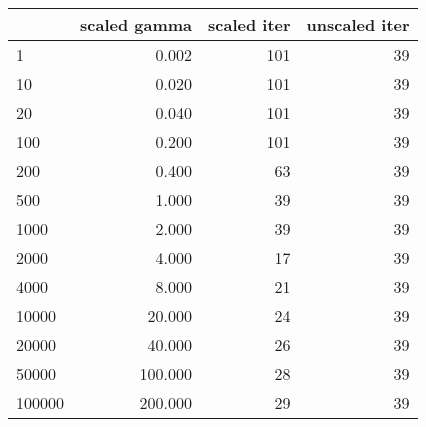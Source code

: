 \begin{tabular}{lrrr}
\toprule
{} &  scaled gamma &  scaled iter &  unscaled iter \\
\midrule
1      &         0.002 &          101 &             39 \\
10     &         0.020 &          101 &             39 \\
20     &         0.040 &          101 &             39 \\
100    &         0.200 &          101 &             39 \\
200    &         0.400 &           63 &             39 \\
500    &         1.000 &           39 &             39 \\
1000   &         2.000 &           39 &             39 \\
2000   &         4.000 &           17 &             39 \\
4000   &         8.000 &           21 &             39 \\
10000  &        20.000 &           24 &             39 \\
20000  &        40.000 &           26 &             39 \\
50000  &       100.000 &           28 &             39 \\
100000 &       200.000 &           29 &             39 \\
\bottomrule
\end{tabular}
